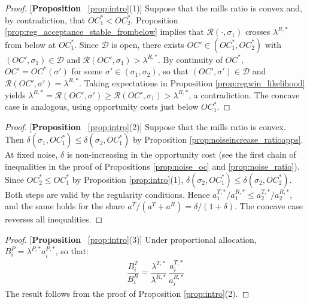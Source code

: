 \begin{proof}{[\textbf{Proposition} ~\ref{prop:intro}(1)]} Suppose that the mills ratio is convex and, by contradiction, that $OC_1^*<OC_2^*$. Proposition \ref{prop:reg_acceptance_stable_frombelow} implies that $\mathcal{R}(\cdot,\sigma_1)$ crosses $\lambda^{R,*}$ from below at $OC_1^*$. Since $\mathcal{D}$ is open, there exists $OC'\in(OC_1^*,OC_2^*)$ with $(OC',\sigma_1)\in\mathcal{D}$ and $\mathcal{R}(OC',\sigma_1)>\lambda^{R,*}$. By continuity of $OC^*$, $OC'=OC^*(\sigma')$ for some $\sigma'\in(\sigma_1,\sigma_2)$, so that $(OC',\sigma')\in\mathcal{D}$ and $\mathcal{R}(OC',\sigma')=\lambda^{R,*}$. Taking expectations in Proposition \ref{prop:regwin_likelihood} yields $\lambda^{R,*}=\mathcal{R}(OC',\sigma')\geq\mathcal{R}(OC',\sigma_1)>\lambda^{R,*}$, a contradiction. The concave case is analogous, using opportunity costs just below $OC_1^*$.
\end{proof}

\begin{proof}{[\textbf{Proposition} ~\ref{prop:intro}(2)]} Suppose that the mills ratio is convex. Then $\delta(\sigma_1,OC_1^*)\leq\delta(\sigma_2,OC_1^*)$ by Proposition \ref{prop:noiseincrease_ratioapps}. At fixed noise, $\delta$ is non-increasing in the opportunity cost (see the first chain of inequalities in the proof of Propositions \ref{prop:noise_oc} and \ref{prop:noise_ratio}). Since $OC_2^*\leq OC_1^*$ by Proposition \ref{prop:intro}(1), $\delta(\sigma_2,OC_1^*)\leq\delta(\sigma_2,OC_2^*)$. Both steps are valid by the regularity conditions. Hence $a_1^{T,*}/a_1^{R,*}\leq a_2^{T,*}/a_2^{R,*}$, and the same holds for the share $a^T/(a^T+a^R)=\delta/(1+\delta)$. The concave case reverses all inequalities.
\end{proof}

\begin{proof}{[\textbf{Proposition} ~\ref{prop:intro}(3)]} Under proportional allocation, $B_i^P=\lambda^{P,*}a_i^{P,*}$, so that:
\begin{align*}
    \dfrac{B_i^T}{B_i^R}=\dfrac{\lambda^{T,*}}{\lambda^{R,*}}\,\dfrac{a_i^{T,*}}{a_i^{R,*}}
\end{align*}
The result follows from the proof of Proposition \ref{prop:intro}(2).
\end{proof}


% 